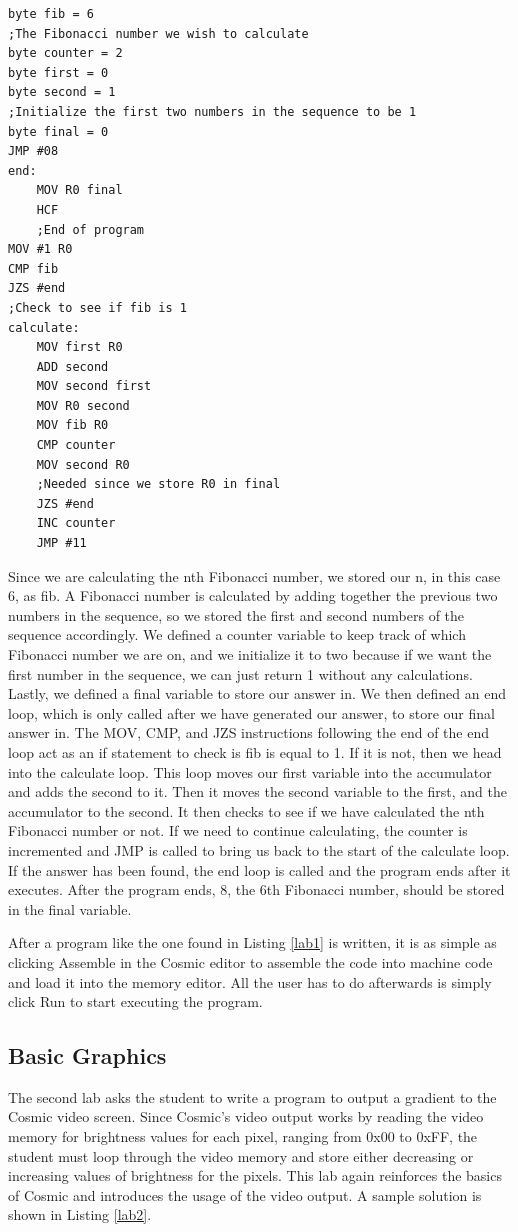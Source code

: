 \documentclass[conference]{IEEEtran}
\begin{document}
\begin{lstlisting}[caption={Cosmic assembly to find the nth Fibonacci number.}, label = {lab1}]
byte fib = 6
;The Fibonacci number we wish to calculate
byte counter = 2
byte first = 0
byte second = 1
;Initialize the first two numbers in the sequence to be 1
byte final = 0
JMP #08
end:
    MOV R0 final
    HCF
    ;End of program
MOV #1 R0
CMP fib
JZS #end
;Check to see if fib is 1
calculate:
    MOV first R0
    ADD second
    MOV second first
    MOV R0 second
    MOV fib R0
    CMP counter
    MOV second R0
    ;Needed since we store R0 in final
    JZS #end
    INC counter
    JMP #11
\end{lstlisting}

Since we are calculating the nth Fibonacci number, we stored our n, in this case 6, as fib. A Fibonacci number is calculated by adding together the previous two numbers in the sequence, so we stored the first and second numbers of the sequence accordingly. We defined a counter variable to keep track of which Fibonacci number we are on, and we initialize it to two because if we want the first number in the sequence, we can just return 1 without any calculations. Lastly, we defined a final variable to store our answer in. We then defined an end loop, which is only called after we have generated our answer, to store our final answer in. The MOV, CMP, and JZS instructions following the end of the end loop act as an if statement to check is fib is equal to 1. If it is not, then we head into the calculate loop. This loop moves our first variable into the accumulator and adds the second to it. Then it moves the second variable to the first, and the accumulator to the second. It then checks to see if we have calculated the nth Fibonacci number or not. If we need to continue calculating, the counter is incremented and JMP is called to bring us back to the start of the calculate loop. If the answer has been found, the end loop is called and the program ends after it executes. After the program ends, 8, the 6th Fibonacci number, should be stored in the final variable.

After a program like the one found in Listing \ref{lab1} is written, it is as simple as clicking Assemble in the Cosmic editor to assemble the code into machine code and load it into the memory editor. All the user has to do afterwards is simply click Run to start executing the program.

\subsection{Basic Graphics}
The second lab asks the student to write a program to output a gradient to the Cosmic video screen. Since Cosmic's video output works by reading the video memory for brightness values for each pixel, ranging from 0x00 to 0xFF, the student must loop through the video memory and store either decreasing or increasing values of brightness for the pixels. This lab again reinforces the basics of Cosmic and introduces the usage of the video output. A sample solution is shown in Listing \ref{lab2}.
\end{document}
